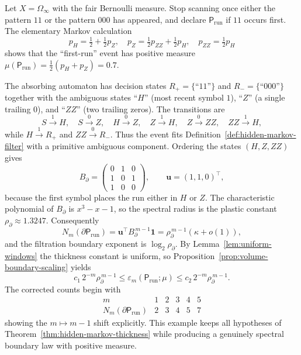 \begin{example}
\label{ex:competing-runs}
Let $X=\Omega_\infty$ with the fair Bernoulli measure.
Stop scanning once either the pattern $11$ or the pattern $000$ has appeared,
and declare $\mathsf{P}_{\mathrm{run}}$ if $11$ occurs first.  The elementary
Markov calculation
\[
p_H=\tfrac12+\tfrac12p_Z,\quad
p_Z=\tfrac12p_{ZZ}+\tfrac12p_H,\quad
p_{ZZ}=\tfrac12p_H
\]
shows that the ``first-run'' event has positive measure
$\mu(\mathsf{P}_{\mathrm{run}})=\tfrac12(p_H+p_Z)=0.7$.

The absorbing automaton has decision states $R_+=\{\text{``11''}\}$ and
$R_-=\{\text{``000''}\}$ together with the ambiguous states
``$H$'' (most recent symbol $1$), ``$Z$'' (a single trailing $0$), and
``$ZZ$'' (two trailing zeros).  The transitions are
\[
S\stackrel{1}{\longrightarrow}H,\quad
S\stackrel{0}{\longrightarrow}Z,\quad
H\stackrel{0}{\longrightarrow}Z,\quad
Z\stackrel{1}{\longrightarrow}H,\quad
Z\stackrel{0}{\longrightarrow}ZZ,\quad
ZZ\stackrel{1}{\longrightarrow}H,
\]
while $H\stackrel{1}{\longrightarrow}R_+$ and $ZZ\stackrel{0}{\longrightarrow}R_-$.
Thus the event fits Definition~\ref{def:hidden-markov-filter} with a primitive
ambiguous component.  Ordering the states $(H,Z,ZZ)$ gives
\[
B_\partial
=\begin{pmatrix}
0&1&0\\[0.5ex]
1&0&1\\[0.5ex]
1&0&0
\end{pmatrix},
\qquad
\mathbf{u}=(1,1,0)^\top,
\]
because the first symbol places the run either in $H$ or $Z$.  The characteristic
polynomial of $B_\partial$ is $x^3-x-1$, so the spectral radius is the plastic
constant $\rho_\partial\approx 1.3247$.  Consequently
\[
N_m(\partial\mathsf{P}_{\mathrm{run}})
=\mathbf{u}^\top B_\partial^{\,m-1}\mathbf{1}
=\rho_\partial^{\,m-1}(\kappa+o(1)),
\]
and the filtration boundary exponent is $\log_2\rho_\partial$.  By
Lemma~\ref{lem:uniform-windows} the thickness constant is uniform, so
Proposition~\ref{prop:volume-boundary-scaling} yields
\[
c_1\,2^{-m}\rho_\partial^{\,m-1}
\le \varepsilon_m(\mathsf{P}_{\mathrm{run}};\mu)
\le c_2\,2^{-m}\rho_\partial^{\,m-1}.
\]
The corrected counts begin with
\[
\begin{array}{c|ccccc}
m & 1 & 2 & 3 & 4 & 5\\ \hline
N_m(\partial\mathsf{P}_{\mathrm{run}}) & 2 & 3 & 4 & 5 & 7
\end{array}
\]
showing the $m\mapsto m-1$ shift explicitly.  This example keeps all
hypotheses of Theorem~\ref{thm:hidden-markov-thickness} while producing a
genuinely spectral boundary law with positive measure.
\end{example}

